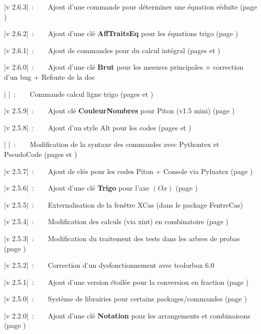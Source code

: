 \documentclass[a4paper,french,11pt]{article}
\newcommand\Cle[1]{{\bfseries\sffamily\textlangle \textcolor{orange!75!black}{#1}\textrangle}}
\begin{document}
{{{{{{{{{{{{{{\small \bverb|v 2.6.3|~:~~~~Ajout d'une commande pour déterminer une équation réduite (page \pageref{eqreduite})

{\small \bverb|v 2.6.2|~:~~~~Ajout d'une clé \Cle{AffTraitsEq} pour les équations trigo (page \pageref{cercletrigo})

{\small \bverb|v 2.6.1|~:~~~~Ajout de commandes pour du calcul intégral (pages \pageref{calcintegr} et \pageref{integrtikz})

{\small \bverb|v 2.6.0|~:~~~~Ajout d'une clé \Cle{Brut} pour les mesures principales + correction d'un bug} + Refonte de la doc

{\small \bverb|       |~:~~~~Commande calcul ligne trigo (pages \pageref{mesureprincipale} et \pageref{lignestrigo})

{\small \bverb|v 2.5.9|~:~~~~Ajout clé \Cle{CouleurNombres} pour \textsf{Piton} (v1.5 mini) (page \pageref{pythonpiton})

{\small \bverb|v 2.5.8|~:~~~~Ajout d'un style \textsf{Alt} pour les codes (pages \pageref{pythonsimple} et \pageref{pytminted})

{\small \bverb|       |~:~~~~Modification de la syntaxe des commandes avec \textsf{Pythontex} et \textsf{PseudoCode} (pages \pageref{pythontex} et \pageref{pseudocode})

{\small \bverb|v 2.5.7|~:~~~~Ajout de clés pour les codes \textsf{Piton} + Console via \textsf{Pyluatex} (page \pageref{pythonpiton})

{\small \bverb|v 2.5.6|~:~~~~Ajout d'une clé \Cle{Trigo} pour l'axe $(Ox)$ (page \pageref{reperagetikz})

{\small \bverb|v 2.5.5|~:~~~~Externalisation de la fenêtre XCas (dans le package \textsf{FentreCas})

{\small \bverb|v 2.5.4|~:~~~~Modification des calculs (via \textsf{xint}) en combinatoire (page \pageref{combinatoire})

{\small \bverb|v 2.5.3|~:~~~~Modification du traitement des tests dans les arbres de probas (page \pageref{arbresprobas})

{\small \bverb|v 2.5.2|~:~~~~Correction d'un dysfonctionnement avec \textsf{tcolorbox 6.0}

{\small \bverb|v 2.5.1|~:~~~~Ajout d'une version étoilée pour la conversion en fraction (page \pageref{convfrac})

{\small \bverb|v 2.5.0|~:~~~~Système de \textsf{librairies} pour certains packages/commandes (page \pageref{librairies})

{\small \bverb|v 2.2.0|~:~~~~Ajout d'une clé \Cle{Notation} pour les arrangements et combinaisons (page \pageref{combinatoire})

}}}}}}}}}}}}}}}}}}}}}}}}}}}}}
\end{document}
